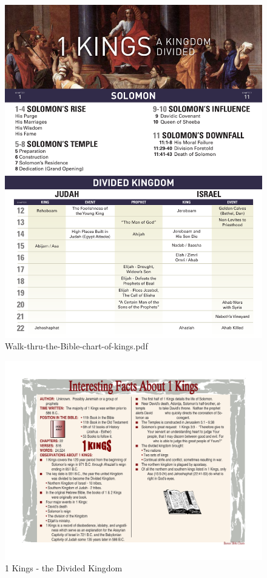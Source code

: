 \newpage
\begin{figure}
\begin{center}
\includegraphics[scale=0.55, angle=0]{11OT-1Kings/References/1kings-chart}
\caption[1 Kings - the Divided Kingdom]{Walk-thru-the-Bible-chart-of-kings.pdf}
\label{fig:Chart of Kings from Walk Thru the Bible}
\end{center}
\end{figure}

\newpage
\begin{figure}
\begin{center}
\includegraphics[scale=0.55, angle=90]{11OT-1Kings/References/interestingfactsaboutfirstkings.pdf}
\caption[1 Kings - the Divided Kingdom]{1 Kings - the Divided Kingdom}
\label{fig:1 Kings - the Divided Kingdom}
\end{center}
\end{figure}